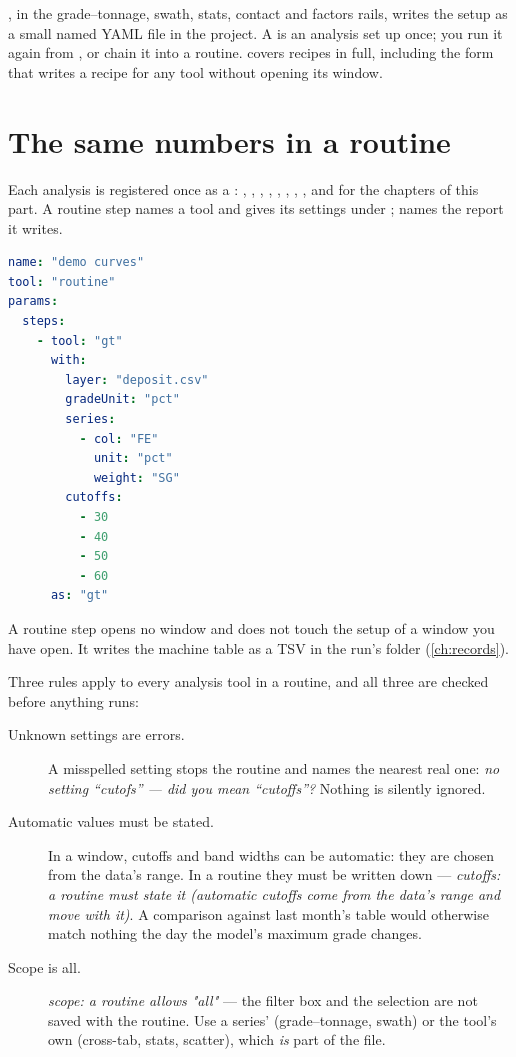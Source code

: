 , in the grade–tonnage, swath, stats, contact and factors rails, writes the setup as a small named YAML file in the project. A  is an analysis set up once; you run it again from , or chain it into a routine.  covers recipes in full, including the form that writes a recipe for any tool without opening its window.

\section{The same numbers in a routine}\label{sec:analysis-routine}
Each analysis is registered once as a : , , , , , , , ,  and  for the chapters of this part. A routine step names a tool and gives its settings under ;  names the report it writes.

\begin{lstlisting}[language=yaml]
name: "demo curves"
tool: "routine"
params:
  steps:
    - tool: "gt"
      with:
        layer: "deposit.csv"
        gradeUnit: "pct"
        series:
          - col: "FE"
            unit: "pct"
            weight: "SG"
        cutoffs:
          - 30
          - 40
          - 50
          - 60
      as: "gt"
\end{lstlisting}

A routine step opens no window and does not touch the setup of a window you have open. It writes the machine table as a TSV in the run's folder (\cref{ch:records}).

Three rules apply to every analysis tool in a routine, and all three are checked before anything runs:

\begin{description}
\item[Unknown settings are errors.] A misspelled setting stops the routine and names the nearest real one: \emph{no setting “cutofs” — did you mean “cutoffs”?} Nothing is silently ignored.
\item[Automatic values must be stated.] In a window, cutoffs and band widths can be automatic: they are chosen from the data's range. In a routine they must be written down — \emph{cutoffs: a routine must state it (automatic cutoffs come from the data’s range and move with it)}. A comparison against last month's table would otherwise match nothing the day the model's maximum grade changes.
\item[Scope is all.] \emph{scope: a routine allows "all"} — the filter box and the selection are not saved with the routine. Use a series'  (grade–tonnage, swath) or the tool's own  (cross-tab, stats, scatter), which \emph{is} part of the file.
\end{description}

